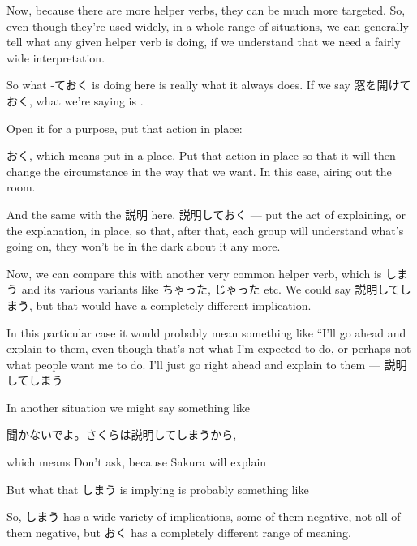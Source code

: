 \thinrule

Now, because there are more helper verbs, they can be much more targeted. So, even though they're used widely, in a whole range of situations, we can generally tell what any given helper verb is doing, if we understand that we need a fairly wide interpretation.

So what -ておく is doing here is really what it always does. If we say 窓を開けておく, what we're saying is\crlf
{}.

{}

Open it for a purpose, put that action in place:

おく, which means put in a place. Put that action in place so that it will then　\crlf
change the circumstance in the way that we want. In this case, airing out the room.

And the same with the 説明 here. 説明しておく --- put the act of explaining, or the explanation, in place, so that, after that, each group will understand what's going on, they won't be in the dark about it any more.

\thinrule

Now, we can compare this with another very common helper verb, which is しまう and its various variants like ちゃった, じゃった etc. We could say 説明してしまう, but that would have a completely different implication.

{}

In this particular case it would probably mean something like\crlf
“I'll go ahead and explain to them, even though that's not what I'm expected to do, or perhaps not what people want me to do.\crlf
I'll just go right ahead and explain to them --- 説明してしまう

In another situation we might say something like

聞かないでよ。さくらは説明してしまうから,

which means Don't ask, because Sakura will explain

{}

But what that しまう is implying is probably something like\crlf
{}

So, しまう has a wide variety of implications, some of them negative, not all of them negative, but おく has a completely different range of meaning.

